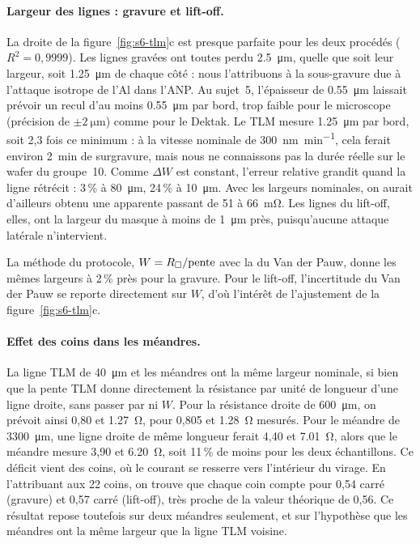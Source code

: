 \paragraph{Largeur des lignes : gravure et lift-off.}
La droite de la figure~\ref{fig:s6-tlm}c est presque parfaite pour les deux procédés ($R^2 = 0{,}9999$). Les lignes gravées ont toutes perdu \qty{2,5}{\micro\metre}, quelle que soit leur largeur, soit \qty{1,25}{\micro\metre} de chaque côté : nous l'attribuons à la sous-gravure due à l'attaque isotrope de l'Al dans l'ANP. Au sujet~5, l'épaisseur de \qty{0,55}{\micro\metre} laissait prévoir un recul d'au moins \qty{0,55}{\micro\metre} par bord, trop faible pour le microscope (précision de $\pm\qty{2}{\micro\metre}$) comme pour le Dektak. Le TLM mesure \qty{1,25}{\micro\metre} par bord, soit 2,3 fois ce minimum : à la vitesse nominale de \qty{300}{\nano\metre\per\minute}, cela ferait environ \qty{2}{\minute} de surgravure, mais nous ne connaissons pas la durée réelle sur le wafer du groupe~10. Comme $\Delta W$ est constant, l'erreur relative grandit quand la ligne rétrécit : 3\,\% à \qty{80}{\micro\metre}, 24\,\% à \qty{10}{\micro\metre}. Avec les largeurs nominales, on aurait d'ailleurs obtenu une \Rsq{} apparente passant de 51 à \qty{66}{\milli\ohm}. Les lignes du lift-off, elles, ont la largeur du masque à moins de \qty{1}{\micro\metre} près, puisqu'aucune attaque latérale n'intervient.

La méthode du protocole, $W = R_{\square}/\text{pente}$ avec la \Rsq{} du Van der Pauw, donne les mêmes largeurs à 2\,\% près pour la gravure. Pour le lift-off, l'incertitude du Van der Pauw se reporte directement sur $W$, d'où l'intérêt de l'ajustement de la figure~\ref{fig:s6-tlm}c.

\paragraph{Effet des coins dans les méandres.}
La ligne TLM de \qty{40}{\micro\metre} et les méandres ont la même largeur nominale, si bien que la pente TLM donne directement la résistance par unité de longueur d'une ligne droite, sans passer par \Rsq{} ni $W$. Pour la résistance droite de \qty{600}{\micro\metre}, on prévoit ainsi 0,80 et \qty{1,27}{\ohm}, pour 0,805 et \qty{1,28}{\ohm} mesurés. Pour le méandre de \qty{3300}{\micro\metre}, une ligne droite de même longueur ferait 4,40 et \qty{7,01}{\ohm}, alors que le méandre mesure 3,90 et \qty{6,20}{\ohm}, soit 11\,\% de moins pour les deux échantillons. Ce déficit vient des coins, où le courant se resserre vers l'intérieur du virage. En l'attribuant aux 22 coins, on trouve que chaque coin compte pour 0,54 carré (gravure) et 0,57 carré (lift-off), très proche de la valeur théorique de 0,56. Ce résultat repose toutefois sur deux méandres seulement, et sur l'hypothèse que les méandres ont la même largeur que la ligne TLM voisine.

